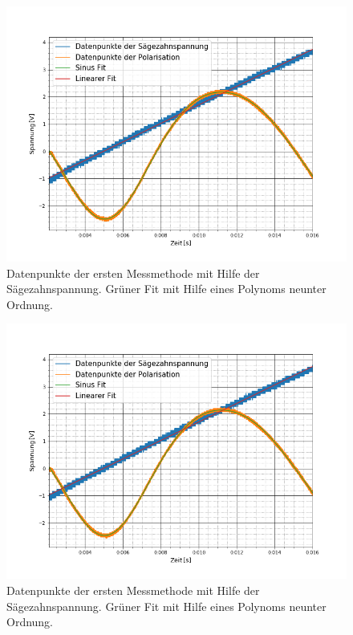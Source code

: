 \begin{figure}[ht]
	\includegraphics[scale=0.5]{Bild/V1_3}
	\centering
	\caption[Plot zu Versuchsteil 1 Nr.3]{Datenpunkte der ersten Messmethode mit Hilfe der Sägezahnspannung. Grüner Fit mit Hilfe eines Polynoms neunter Ordnung.}
\end{figure}
\begin{figure}[ht]
	\includegraphics[scale=0.5]{Bild/V1_4}
	\centering
	\caption[Plot zu Versuchsteil 1 Nr.4]{Datenpunkte der ersten Messmethode mit Hilfe der Sägezahnspannung. Grüner Fit mit Hilfe eines Polynoms neunter Ordnung.}
\end{figure}
